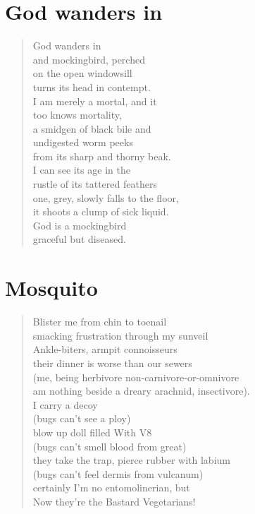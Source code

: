 \documentclass[times,12pt]{book}
\begin{document}
\section*{God wanders in}
\begin{verse}
God wanders in\\
and mockingbird, perched\\
on the open windowsill\\
turns its head in contempt.\\
I am merely a mortal, and it\\
too knows mortality,\\
a smidgen of black bile and\\
undigested worm peeks\\
from its sharp and thorny beak.\\
I can see its age in the\\
rustle of its tattered feathers\\
one, grey, slowly falls to the floor,\\
it shoots a clump of sick liquid.\\
God is a mockingbird\\
graceful but diseased.\\
\end{verse}
\newpage

\section*{Mosquito}
\begin{verse}
Blister me from chin to toenail\\
smacking frustration through my sunveil\\
Ankle-biters, armpit connoisseurs\\
their dinner is worse than our sewers\\
(me, being herbivore non-carnivore-or-omnivore\\
am nothing beside a dreary arachnid, insectivore).\\[14pt]

I carry a decoy\\
(bugs can't see a ploy)\\
blow up doll filled With V8\\
(bugs can't smell blood from great)\\
they take the trap, pierce rubber with labium\\
(bugs can't feel dermis from vulcanum)\\
certainly I'm no entomolinerian, but\\
Now they're the Bastard Vegetarians!\\
\end{verse}
\newpage
\end{document}
